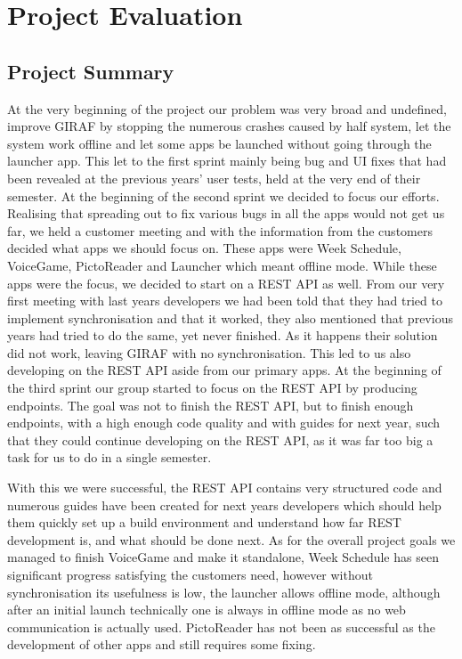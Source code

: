 \chapter{Project Evaluation}
\section{Project Summary}
At the very beginning of the project our problem was very broad and undefined, improve GIRAF by stopping the numerous crashes caused by half system, let the system work offline and let some apps be launched without going through the launcher app.
This let to the first sprint mainly being bug and UI fixes that had been revealed at the previous years' user tests, held at the very end of their semester.
At the beginning of the second sprint we decided to focus our efforts.
Realising that spreading out to fix various bugs in all the apps would not get us far, we held a customer meeting and with the information from the customers decided what apps we should focus on.
These apps were Week Schedule, VoiceGame, PictoReader and Launcher which meant offline mode.
While these apps were the focus, we decided to start on a REST API as well.
From our very first meeting with last years developers we had been told that they had tried to implement synchronisation and that it worked, they also mentioned that previous years had tried to do the same, yet never finished.
As it happens their solution did not work, leaving GIRAF with no synchronisation.
This led to us also developing on the REST API aside from our primary apps.
\bigskip \noindent
At the beginning of the third sprint our group started to focus on the REST API by producing endpoints.
The goal was not to finish the REST API, but to finish enough endpoints, with a high enough code quality and with guides for next year, such that they could continue developing on the REST API, as it was far too big a task for us to do in a single semester.

With this we were successful, the REST API contains very structured code and numerous guides have been created for next years developers which should help them quickly set up a build environment and understand how far REST development is, and what should be done next.
As for the overall project goals we managed to finish VoiceGame and make it standalone, Week Schedule has seen significant progress satisfying the customers need, however without synchronisation its usefulness is low, the launcher allows offline mode, although after an initial launch technically one is always in offline mode as no web communication is actually used.
PictoReader has not been as successful as the development of other apps and still requires some fixing.

